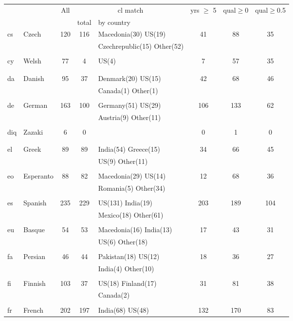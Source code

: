 \begin{figure}[h]
\centering
\begin{tabular}{llcclccc}
&&All&\multicolumn{2}{c}{cl match}&yrs $\geq$ 5&qual$\geq$0&qual$\geq$0.5\\
&&&total&by country&&\\
\hline\hline
cs&Czech&120&116&Macedonia(30) US(19) &41&88&35\\
&&&&Czechrepublic(15) Other(52) &&&\\
&&&&&&&\\
cy&Welsh&77&4&US(4) &7&57&35\\
&&&&&&&\\
&&&&&&&\\
da&Danish&95&37&Denmark(20) US(15) &42&68&46\\
&&&&Canada(1) Other(1) &&&\\
&&&&&&&\\
de&German&163&100&Germany(51) US(29) &106&133&62\\
&&&&Austria(9) Other(11) &&&\\
&&&&&&&\\
diq&Zazaki&6&0&&0&1&0\\
&&&&&&&\\
&&&&&&&\\
el&Greek&89&89&India(54) Greece(15) &34&66&45\\
&&&&US(9) Other(11) &&&\\
&&&&&&&\\
eo&Esperanto&88&82&Macedonia(29) US(14) &12&68&36\\
&&&&Romania(5) Other(34) &&&\\
&&&&&&&\\
es&Spanish&235&229&US(131) India(19) &203&189&104\\
&&&&Mexico(18) Other(61) &&&\\
&&&&&&&\\
eu&Basque&54&53&Macedonia(16) India(13) &17&43&31\\
&&&&US(6) Other(18) &&&\\
&&&&&&&\\
fa&Persian&46&44&Pakistan(18) US(12) &18&36&27\\
&&&&India(4) Other(10) &&&\\
&&&&&&&\\
fi&Finnish&103&37&US(18) Finland(17) &31&81&38\\
&&&&Canada(2) &&&\\
&&&&&&&\\
fr&French&202&197&India(68) US(48) &132&170&83\\

\end{tabular}
\end{figure}
